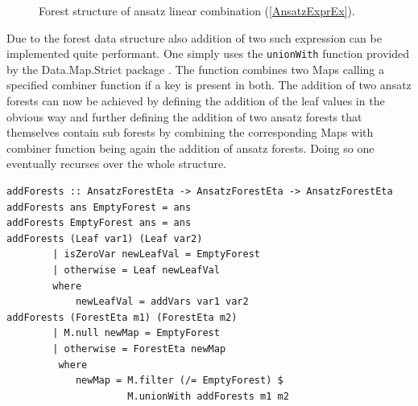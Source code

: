 \documentclass[a4paper,12pt, DIV=14, BCOR=5mm, twoside, headsepline]{scrbook}
\begin{document}
\begin{figure}
\caption{Forest structure of ansatz linear combination (\ref{AnsatzExprEx}). }
\label{AnsatzExprExForest}
\end{figure}
Due to the forest data structure also addition of two such expression can be implemented quite performant. One simply uses the \texttt{unionWith} function provided by the Data.Map.Strict package \cite{HackageMap}. The function combines two Maps calling a specified combiner function if a key is present in both. The addition of two ansatz forests can now be achieved by defining the addition of the leaf values in the obvious way and further defining the addition of two ansatz forests that themselves contain sub forests by combining the corresponding Maps with combiner function being again the addition of ansatz forests. Doing so one eventually recurses over the whole structure. 

\begin{samepage} 
\begin{verbatim}
addForests :: AnsatzForestEta -> AnsatzForestEta -> AnsatzForestEta
addForests ans EmptyForest = ans
addForests EmptyForest ans = ans
addForests (Leaf var1) (Leaf var2)
        | isZeroVar newLeafVal = EmptyForest
        | otherwise = Leaf newLeafVal
        where
            newLeafVal = addVars var1 var2
addForests (ForestEta m1) (ForestEta m2)
        | M.null newMap = EmptyForest
        | otherwise = ForestEta newMap
         where
            newMap = M.filter (/= EmptyForest) $
                     M.unionWith addForests m1 m2
\end{verbatim} 
\end{samepage}
\end{document}
